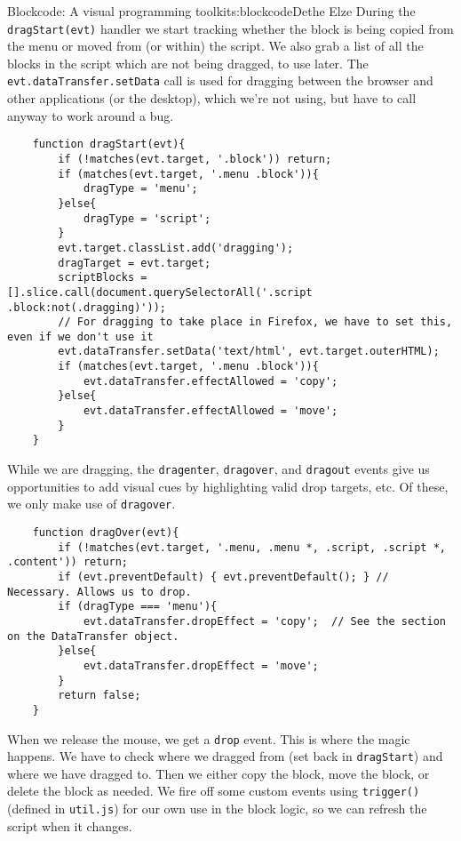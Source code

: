 \begin{aosachapter}{Blockcode: A visual programming toolkit}{s:blockcode}{Dethe Elze}
During the \texttt{dragStart(evt)} handler we start tracking whether the
block is being copied from the menu or moved from (or within) the
script. We also grab a list of all the blocks in the script which are
not being dragged, to use later. The \texttt{evt.dataTransfer.setData}
call is used for dragging between the browser and other applications (or
the desktop), which we're not using, but have to call anyway to work
around a bug.

\begin{verbatim}
    function dragStart(evt){
        if (!matches(evt.target, '.block')) return;
        if (matches(evt.target, '.menu .block')){
            dragType = 'menu';
        }else{
            dragType = 'script';
        }
        evt.target.classList.add('dragging');
        dragTarget = evt.target;
        scriptBlocks = [].slice.call(document.querySelectorAll('.script .block:not(.dragging)'));
        // For dragging to take place in Firefox, we have to set this, even if we don't use it
        evt.dataTransfer.setData('text/html', evt.target.outerHTML);
        if (matches(evt.target, '.menu .block')){
            evt.dataTransfer.effectAllowed = 'copy';
        }else{
            evt.dataTransfer.effectAllowed = 'move';
        }
    }
\end{verbatim}

While we are dragging, the \texttt{dragenter}, \texttt{dragover}, and
\texttt{dragout} events give us opportunities to add visual cues by
highlighting valid drop targets, etc. Of these, we only make use of
\texttt{dragover}.

\begin{verbatim}
    function dragOver(evt){
        if (!matches(evt.target, '.menu, .menu *, .script, .script *, .content')) return;
        if (evt.preventDefault) { evt.preventDefault(); } // Necessary. Allows us to drop.
        if (dragType === 'menu'){
            evt.dataTransfer.dropEffect = 'copy';  // See the section on the DataTransfer object.
        }else{
            evt.dataTransfer.dropEffect = 'move';
        }
        return false;
    }
\end{verbatim}

When we release the mouse, we get a \texttt{drop} event. This is where
the magic happens. We have to check where we dragged from (set back in
\texttt{dragStart}) and where we have dragged to. Then we either copy
the block, move the block, or delete the block as needed. We fire off
some custom events using \texttt{trigger()} (defined in
\texttt{util.js}) for our own use in the block logic, so we can refresh
the script when it changes.


\end{aosachapter}
